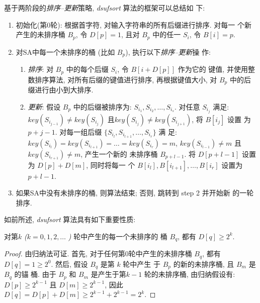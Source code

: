 \documentclass{ws-ijprai}
\begin{document}
基于两阶段的\emph{排序--更新}策略, \emph{dsufsort} 算法的框架可以总结如
下:

\begin{enumerate}

\item 初始化(第0轮): 根据首字符, 对输入字符串的所有后缀进行排序. 对每一
  个新产生的未排序桶 $B_p$, 令 $D[p] = 1$, 且对 $B_p$ 中的任一 $S_i$,
  令 $B[i] = p$.

\item 对SA中每一个未排序的桶 (比如 $B_p$), 执行以下\emph{排序--更新}操
  作:

\begin{enumerate}[\bfseries i.]
\item \emph{排序}: 对 $B_p$ 中的每个后缀 $S_i$, 令 $B[i+D[p]]$ 作为它的
  键值, 并使用整数排序算法, 对所有后缀的键值进行排序, 再根据键值大小,
  对 $B_p$ 中的后缀进行由小到大排序.
\item \emph{更新}: 假设 $B_p$ 中的后缀被排序为: $S_{i_1},
  S_{i_2},\dots,S_{i_s}$. 对任意 $S_{i_j}$ 满足:
  $key(S_{i_{j-1}}) \neq key(S_{i_j})$
  且$key(S_{i_j}) \neq key(S_{i_{j+1}})$, 将 $B[i_j]$ 设置
  为 $p+j-1$. 对每一组后缀 $\{S_{i_l}, S_{i_{l+1}},\dots,S_{i_r}\}$ 满
  足: $key(S_{i_l}) = key(S_{i_{l+1}}) = \dots = key(S_{i_r}) = m$,
  $key(S_{i_{l-1}}) \neq m$ 且 $key(S_{i_{r+1}}) \neq m$, 产生一个新的
  未排序桶 $B_{p+l-1}$. 将 $D[p+l-1]$ 设置为 $D[p] + D[m]$, 同时将每一
  个 $B[i_l], B[i_{l+1}], \dots, B[i_r]$ 设置为 $p+l-1$.
\end{enumerate}

\item 如果SA中没有未排序的桶, 则算法结束; 否则, 跳转到 step 2 并开始新
  的一轮排序.

\end{enumerate}

如前所述, \emph{dsufsort} 算法具有如下重要性质:

\begin{lemma}
  对第$k$ \emph{(}$k = 0,1,2,\dots$ \emph{)} 轮中产生的每一个未排序的
  桶 $B_q$, 都有 $D[q] \geq 2^k$.
\end{lemma}

\begin{proof} 由归纳法可证. 首先, 对于任何第0轮中产生的未排序桶 $B_q$,
  都有 $D[q] = 1 \geq 2^0$.  然后, 假设 $B_q$ 是第 $k$ 轮中产生
  于 $B_p$ 的新的未排序桶, 且 $B_m$ 是 $B_q$ 的锚
  桶. 由于 $B_p$ 和 $B_m$ 是产生于第$k-1$ 轮的未排序桶, 由归纳假设有:
  $D[p] \geq 2^{k-1}$ 且 $D[m] \geq 2^{k-1}$, 因此
  $D[q] = D[p] + D[m] \geq 2^{k-1} + 2^{k-1} = 2^k$.
\end{proof}
\end{document}

